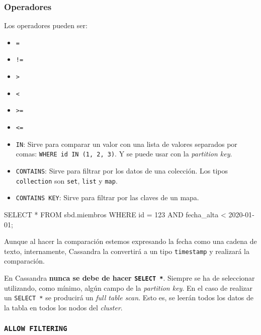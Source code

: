 \documentclass[
]{book}
\newenvironment{Shaded}{}{}
\newcommand{\NormalTok}[1]{#1}
\providecommand{\tightlist}{%
  \setlength{\itemsep}{0pt}\setlength{\parskip}{0pt}}
\begin{document}
\subsubsection{Operadores}\label{operadores}

Los operadores pueden ser:

\begin{itemize}
\tightlist
\item
  \texttt{=}
\item
  \texttt{!=}
\item
  \texttt{\textgreater{}}
\item
  \texttt{\textless{}}
\item
  \texttt{\textgreater{}=}
\item
  \texttt{\textless{}=}
\item
  \texttt{IN}: Sirve para comparar un valor con una lista de valores separados por comas: \texttt{WHERE\ id\ IN\ (1,\ 2,\ 3)}. Y se puede usar con la \emph{partition key}.
\item
  \texttt{CONTAINS}: Sirve para filtrar por los datos de una colección. Los tipos \texttt{collection} son \texttt{set}, \texttt{list} y \texttt{map}.
\item
  \texttt{CONTAINS\ KEY}: Sirve para filtrar por las claves de un mapa.
\end{itemize}

\begin{Shaded}
\begin{Highlighting}[]
\NormalTok{SELECT * FROM sbd.miembros WHERE id = 123 AND fecha\_alta \textless{} \textquotesingle{}2020{-}01{-}01\textquotesingle{};}
\end{Highlighting}
\end{Shaded}

Aunque al hacer la comparación estemos expresando la fecha como una cadena de texto, internamente, Cassandra la convertirá a un tipo \texttt{timestamp} y realizará la comparación.

En Cassandra \textbf{nunca se debe de hacer \texttt{SELECT\ *}}. Siempre se ha de seleccionar utilizando, como mínimo, algún campo de la \emph{partition key}. En el caso de realizar un \texttt{SELECT\ *} se producirá un \emph{full table scan}. Esto es, se leerán todos los datos de la tabla en todos los nodos del \emph{cluster}.

\subsubsection{\texorpdfstring{\texttt{ALLOW\ FILTERING}}{ALLOW FILTERING}}\label{allow-filtering}
\end{document}
